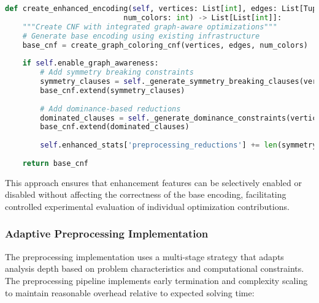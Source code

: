 \begin{lstlisting}[language=Python, caption=Enhanced Encoding Integration]
def create_enhanced_encoding(self, vertices: List[int], edges: List[Tuple[int, int]], 
                           num_colors: int) -> List[List[int]]:
    """Create CNF with integrated graph-aware optimizations"""
    # Generate base encoding using existing infrastructure
    base_cnf = create_graph_coloring_cnf(vertices, edges, num_colors)
    
    if self.enable_graph_awareness:
        # Add symmetry breaking constraints
        symmetry_clauses = self._generate_symmetry_breaking_clauses(vertices, num_colors)
        base_cnf.extend(symmetry_clauses)
        
        # Add dominance-based reductions
        dominated_clauses = self._generate_dominance_constraints(vertices, edges, num_colors)
        base_cnf.extend(dominated_clauses)
        
        self.enhanced_stats['preprocessing_reductions'] += len(symmetry_clauses) + len(dominated_clauses)
    
    return base_cnf
\end{lstlisting}

This approach ensures that enhancement features can be selectively enabled or disabled without affecting the correctness of the base encoding, facilitating controlled experimental evaluation of individual optimization contributions.

\subsubsection{Adaptive Preprocessing Implementation}

The preprocessing implementation uses a multi-stage strategy that adapts analysis depth based on problem characteristics and computational constraints. The preprocessing pipeline implements early termination and complexity scaling to maintain reasonable overhead relative to expected solving time:

